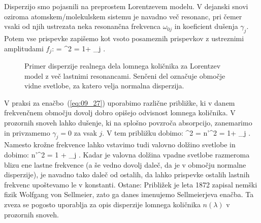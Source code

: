 Disperzijo smo pojasnili na preprostem Lorentzevem modelu.
V dejanski snovi oziroma atomskem/molekulskem sistemu je navadno več resonanc, pri čemer
vsaki od njih ustrezata neka resonančna frekvenca $\omega_{0j}$ in koeficient
dušenja $\gamma_j$. Potem vse prispevke zapišemo kot vsoto posameznih prispevkov 
z ustreznimi amplitudami $f_j$:
\beq
\varepsilon = ^2 = 1+ \sum_j .
\label{eq:09_27}
\eeq
\begin{figure}[h!]
\centering
\def\svgwidth{140truemm} 

\caption{Primer disperzije realnega dela lomnega količnika za Lorentzev model 
z več lastnimi resonancami. Senčeni del označuje območje vidne svetlobe, 
za katero velja normalna disperzija.}
\label{fig:09_disp_multi}
\end{figure}

V praksi za enačbo~(\ref{eq:09_27}) uporabimo različne približke, ki v danem frekvenčnem
območju dovolj dobro opišejo odvisnost lomnega količnika. V prozornih snoveh lahko 
dušenje, ki na splošno povzroča absorpcijo, zanemarimo in privzamemo $\gamma_j = 0$ za 
vsak $j$. V tem približku dobimo:
\beq
{}^2 = n'^2 = 1+ \sum_j .
\label{eq:09_28}
\eeq
Namesto krožne frekvence lahko vstavimo tudi valovno dolžino svetlobe in dobimo:
\beq
n'^2 = 1 + \sum_j .
\label{eq:09_29}
\eeq
Kadar je valovna dolžina vpadne svetlobe razmeroma blizu ene lastne frekvence (a še vedno 
dovolj daleč, da je v območju normalne disperzije), je navadno tako daleč
od ostalih, da lahko prispevke ostalih lastnih frekvenc upoštevamo le v konstanti. Ostane:
Približek je leta 1872 zapisal nemški fizik Wolfgang von Sellmeier, zato ga danes
imenujemo Sellmeierjeva enačba. Ta zveza se pogosto uporablja za opis disperzije 
lomnega količnika $n(\lambda)$ v prozornih snoveh. 

